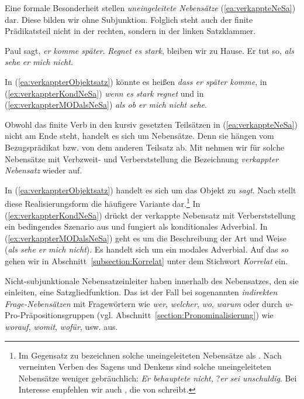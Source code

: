 Eine formale Besonderheit stellen \textit{uneingeleitete Nebensätze} (\ref{ea:verkappteNeSa}) dar. Diese bilden wir ohne Subjunktion. Folglich steht auch der finite Prädikatsteil nicht in der rechten, sondern in der linken Satzklammer. 

\ea \label{ea:verkappteNeSa}
\ea \label{ea:verkappterObjektsatz} Paul sagt, \textit{er komme später}.
\ex \label{ex:verkappterKondNeSa} \textit{Regnet es stark}, bleiben wir zu Hause.
\ex \label{ex:verkappterMODalsNeSa} Er tut so, \textit{als sehe er mich nicht}.
\z 
\z 

In (\ref{ea:verkappterObjektsatz}) könnte es heißen \textit{dass er später komme}, in (\ref{ex:verkappterKondNeSa}) \textit{wenn es stark regnet} und in (\ref{ex:verkappterMODalsNeSa}) \textit{als ob er mich nicht sehe}.    

Obwohl das finite Verb in den kursiv gesetzten Teilsätzen in (\ref{ea:verkappteNeSa}) nicht am Ende steht, handelt es sich um Nebensätze. Denn sie hängen vom Bezugsprädikat bzw. von dem anderen Teilsatz ab. Mit \citet[70]{Welke2007} nehmen wir für solche Nebensätze mit Verbzweit- und Verberststellung die Bezeichnung \textit{verkappter Nebensatz} wieder auf. 

In (\ref{ea:verkappterObjektsatz}) handelt es sich um das Objekt zu \textit{sagt}. Nach \citet[119]{Bausewein1990} stellt diese Realisierungsform die häufigere Variante dar.\footnote{Im Gegensatz zu \citet[119]{Bausewein1990} bezeichnen \citet[167]{OehlSeiler2013} solche uneingeleiteten Nebensätze als . Nach verneinten Verben des Sagens und Denkens sind solche uneingeleiteten Nebensätze weniger gebräuchlich: \textit{Er behauptete nicht,} ?\textit{er sei unschuldig}. Bei Interesse empfehlen wir auch \citet[121]{Reis1997}, die von  schreibt.} In (\ref{ex:verkappterKondNeSa}) drückt der verkappte Nebensatz mit Verberststellung ein bedingendes Szenario aus und fungiert als konditionales Adverbial. In (\ref{ex:verkappterMODalsNeSa}) geht es um die Beschreibung der Art und Weise (\textit{als sehe er mich nicht}). Es handelt sich um ein modales Adverbial. Auf das \textit{so} gehen wir in Abschnitt~\ref{subsection:Korrelat} unter dem Stichwort \textit{Korrelat} ein.  

Nicht-subjunktionale Nebensatzeinleiter haben innerhalb des Nebensatzes, den sie einleiten, eine Satzgliedfunktion. Das ist der Fall bei sogenannten \textit{indirekten Frage-Nebensätzen} mit Fragewörtern wie \textit{wer}, \textit{welcher}, \textit{wo}, \textit{warum} oder durch \textit{w}-Pro-Präpositionsgruppen (vgl. Abschnitt~\ref{section:Pronominalisierung}) wie \textit{worauf}, \textit{womit}, \textit{wofür}, usw. aus. 

